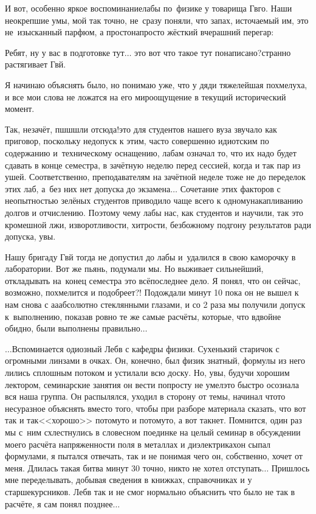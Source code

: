 И вот, особенно яркое воспоминание\mdash лабы по~физике у товарища Гв\sdash го. Наши неокрепшие умы, мой так точно, не~сразу поняли, что запах, источаемый им, это не~изысканный парфюм, а просто\sdash напросто жёсткий вчерашний перегар:

\diagdash Ребят, ну у вас в подготовке тут$\ldots$ это вот что такое тут понаписано?\mdash странно растягивает Гв\sdash й.

Я начинаю объяснять было, но понимаю уже, что у дяди тяжелейшая похмелуха, и все мои слова не ложатся на его мироощущение в текущий исторический момент.

\diagdash Так, незачёт, пш\sdash ш\sdash шли отсюда!\mdash это для студентов нашего вуза звучало как приговор, поскольку недопуск к этим, часто совершенно идиотским по содержанию и~техническому оснащению, лабам означал то, что их надо будет сдавать в конце семестра, в зачётную неделю перед сессией, когда и так пар из ушей. Соответственно, преподавателям на зачётной неделе тоже не до переделок этих лаб, а~без них нет допуска до экзамена$\ldots$ Сочетание этих факторов с неопытностью зелёных студентов приводило чаще всего к одному\mdash накапливанию долгов и отчислению. Поэтому чему лабы нас, как студентов и научили, так это кромешной лжи, изворотливости, хитрости, безбожному подгону результатов ради допуска, увы.

Нашу бригаду Гв\sdash й тогда не допустил до лабы и~удалился в свою каморочку в лаборатории. Вот же пьянь, подумали мы. Но выживает сильнейший, откладывать на~конец семестра это всё\mdash последнее дело. Я понял, что он сейчас, возможно, похмелится и подобреет?! Подождали минут 10 пока он не вышел к нам снова с а\sdash а\sdash абсолютно стеклянными глазами, и со 2 раза мы получили допуск к~выполнению, показав ровно те же самые расчёты, которые, что вдвойне обидно, были выполнены правильно$\ldots$

$\ldots$Вспоминается одиозный Леб\sdash в с кафедры физики. Сухенький старичок с огромными линзами в очках. Он, конечно, был физик знатный, формулы из него лились сплошным потоком и устилали всю доску. Но, увы, будучи хорошим лектором, семинарские занятия он вести попросту не умел\mdash это быстро осознала вся наша группа. Он распылялся, уходил в сторону от темы, начинал что\sdash то несуразное объяснять вместо того, чтобы при разборе материала сказать, что вот так и так\mdash <<хорошо>> потому\sdash то и потому\sdash то, а вот так\mdash нет. Помнится, один раз мы с~ним схлестнулись в словесном поединке на целый семинар в обсуждении моего расчёта напряженности поля в металлах и диэлектриках\mdash он сыпал формулами, я пытался отвечать, так и не понимая чего он, собственно, хочет от меня. Длилась такая битва минут 30 точно, никто не хотел отступать$\ldots$ Пришлось мне переделывать, добывая сведения в книжках, справочниках и у старшекурсников. Леб\sdash в так и не смог нормально объяснить что было не так в расчёте, я сам понял позднее$\ldots$

\begin{center}
\end{center}